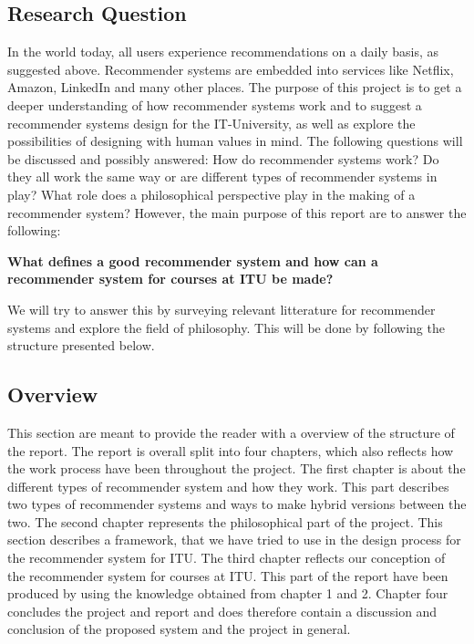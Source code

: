 \subsection*{Research Question}
\label{subsec:researchquestion}
In the world today, all users experience recommendations on a daily basis, as suggested above. Recommender systems are embedded into services like Netflix, Amazon, LinkedIn and many other places. \newline
The purpose of this project is to get a deeper understanding of how recommender systems work and to suggest a recommender systems design for the IT-University, as well as explore the possibilities of designing with human values in mind. \newline
The following questions will be discussed and possibly answered: How do recommender systems work? Do they all work the same way or are different types of recommender systems in play? What role does a philosophical perspective play in the making of a recommender system? However, the main purpose of this report are to answer the following: \newline

\textbf{What defines a good recommender system and how can a recommender system for courses at ITU be made?}\newline

We will try to answer this by surveying relevant litterature for recommender systems and explore the field of philosophy. This will be done by following the structure presented below.

\subsection*{Overview}
This section are meant to provide the reader with a overview of the structure of the report.\newline
The report is overall split into four chapters, which also reflects how the work process have been throughout the project.\newline 
The first chapter is about the different types of recommender system and how they work. This part describes two types of recommender systems and ways to make hybrid versions between the two.\newline
The second chapter represents the philosophical part of the project. This section describes a framework, that we have tried to use in the design process for the recommender system for ITU. \newline
The third chapter reflects our conception of the recommender system for courses at ITU. This part of the report have been produced by using the knowledge obtained from chapter 1 and 2.\newline
Chapter four concludes the project and report and does therefore contain a discussion and conclusion of the proposed system and the project in general.
\newpage
